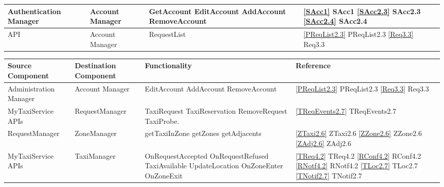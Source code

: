 \documentclass[11pt, a4paper,titlepage]{article}
\begin{document}
\begin{tabularx}{\textwidth}{| X |X |X |X|}
		\\
		\hline Authentication Manager & Account Manager & 
		GetAccount\newline
		EditAccount\newline
		AddAccount\newline
		RemoveAccount\newline
		&  \ref{SAcc1} SAcc1 \newline \ref{SAcc2.3} SAcc2.3 \newline \ref{SAcc2.4} SAcc2.4\\
			\hline API & Account Manager & 
			RequestList
			&\ref{PReqList2.3} PReqList2.3 \newline \ref{Req3.3} Req3.3\\
		\hline
	\end{tabularx}
	\begin{tabularx}{\textwidth}{| X |X |X |X|}
		\hline \textbf{Source Component} &\textbf{ Destination Component}&\textbf{Functionality} & \textbf{Reference} \\
		\hline Administration Manager & Account Manager &  
		EditAccount\newline
		AddAccount\newline
		RemoveAccount\newline
		&\ref{PReqList2.3} PReqList2.3 \newline \ref{Req3.3} Req3.3\\
		\hline MyTaxiService APIs & RequestManager &  
		TaxiRequest\newline
		TaxiReservation\newline
		RemoveRequest\newline
		TaxiProbe.
		&\ref{TReqEvents2.7} TReqEvents2.7\\
		\hline RequestManager & ZoneManager &  
		getTaxiInZone\newline
		getZones\newline
		getAdjacents\newline
		& \ref{ZTaxi2.6} ZTaxi2.6  \newline\ref{ZZone2.6} ZZone2.6  \newline\ref{ZAdj2.6} ZAdj2.6  \\
		\hline MyTaxiService APIs & TaxiManager &  
		OnRequestAccepted\newline
		OnRequestRefused\newline
		TaxiAvailable\newline
		UpdateLocation\newline
		OnZoneEnter\newline
		OnZoneExit
		&\ref{TReq4.2} TReq4.2  \newline\ref{RConf4.2} RConf4.2  \newline\ref{RNotf4.2} RNotf4.2  \newline\ref{TLoc2.7} TLoc2.7  \newline\ref{TNotif2.7} TNotif2.7\\
		\hline
	\end{tabularx}
	\newline
	\newpage
\end{document}
